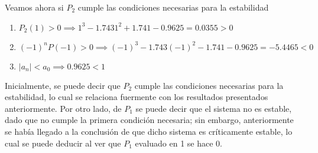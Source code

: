 Veamos ahora si $P_2$ cumple las condiciones necesarias para la estabilidad
\begin{enumerate}
\item $P_2(1) > 0 \implies 1^3 - 1.743 1^2 + 1.741 - 0.9625 = 0.0355 > 0$
\item $(-1)^nP(-1)>0 \implies (-1)^3 - 1.743 (-1)^2 - 1.741 - 0.9625 = -5.4465 < 0$
\item $|a_n| < a_0 \implies 0.9625 < 1$ 
\end{enumerate}
\textbf{}

Inicialmente, se puede decir que $P_2$ cumple las condiciones necesarias para la estabilidad, lo cual se relaciona fuermente con los resultados presentados anteriormente. Por otro lado, de $P_1$ se puede decir que el sistema no es estable, dado que no cumple la primera condición necesaria; sin embargo, anteriormente se había llegado a la conclusión de que dicho sistema es críticamente estable, lo cual se puede deducir al ver que $P_1$ evaluado en 1 se hace 0. %